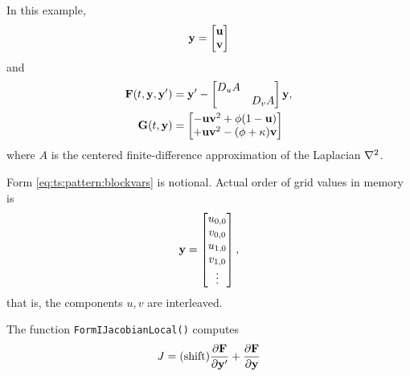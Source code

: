 In this example,
\begin{equation}
\mathbf{y} = \begin{bmatrix} \mathbf{u} \\ \mathbf{v} \end{bmatrix}  \label{eq:ts:pattern:blockvars}
\end{equation}
and
\begin{align}
\mathbf{F}(t,\mathbf{y},\mathbf{y}') &= \mathbf{y}' - \begin{bmatrix}
D_u A & \\ & D_v A \end{bmatrix} \mathbf{y},  \label{eq:ts:pattern:blockode} \\
\mathbf{G}(t,\mathbf{y}) &= \begin{bmatrix}
- \mathbf{u} \mathbf{v}^2 + \phi (1-\mathbf{u}) \\
+ \mathbf{u} \mathbf{v}^2 - (\phi + \kappa) \mathbf{v}
\end{bmatrix}
\end{align}
where $A$ is the centered finite-difference approximation of the Laplacian $\nabla^2$.

Form \eqref{eq:ts:pattern:blockvars} is notional.  Actual order of grid values in memory is
\begin{equation}
\mathbf{y} = \begin{bmatrix} u_{0,0} \\ v_{0,0} \\ u_{1,0} \\ v_{1,0} \\ \vdots \end{bmatrix}, \label{eq:ts:pattern:interleaved}
\end{equation}
that is, the components $u,v$ are interleaved.

The function \texttt{FormIJacobianLocal()} computes
\begin{equation}
J = (\text{shift}) \frac{\partial \mathbf{F}}{\partial \mathbf{y}'} + \frac{\partial \mathbf{F}}{\partial \mathbf{y}}
\label{eq:ts:pattern:jacobianshift}
\end{equation}





